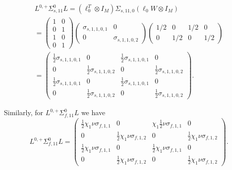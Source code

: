 \begin{multline}
	L^{0,+}  \Sigma_{s,11}^{0} L = (\ell_{0}^{T} \otimes I_{M})\Sigma_{s,11,0} (\ell_{0} W \otimes I_{M}) \\ = 
	\begin{pmatrix}
		1 & 0 \\
		0 & 1 \\
		1 & 0 \\
		0 & 1
	\end{pmatrix}
	\begin{pmatrix}
		\sigma_{s,1,1,0,1} & 0 \\
		0 & \sigma_{s,1,1,0,2}
	\end{pmatrix}
	\begin{pmatrix}
		1/2 & 0 & 1/2 & 0 \\
		0 & 1/2 & 0 & 1/2
	\end{pmatrix} \\ =
	\begin{pmatrix}
		\frac{1}{2} \sigma_{s,1,1,0,1} & 0 & \frac{1}{2} \sigma_{s,1,1,0,1} & 0 \\
		0 & \frac{1}{2} \sigma_{s,1,1,0,2} & 0 & \frac{1}{2} \sigma_{s,1,1,0,2}  \\
		\frac{1}{2} \sigma_{s,1,1,0,1} & 0 & \frac{1}{2} \sigma_{s,1,1,0,1} & 0 \\
		0 & \frac{1}{2} \sigma_{s,1,1,0,2} & 0 & \frac{1}{2} \sigma_{s,1,1,0,2}
	\end{pmatrix}.
\end{multline}

%	
%	
%	

Similarly, for $L^{0,+}  \Sigma_{f,11}^{0} L$ we have
\begin{equation}
L^{0,+}  \Sigma_{f,11}^{0} L = 
		\begin{pmatrix}
			\frac{1}{2} \chi_{1}\nu\sigma_{f,1,1} & 0 & \chi_{1}\frac{1}{2} \nu\sigma_{f,1,1} & 0 \\
			0 & \frac{1}{2} \chi_{1}\nu\sigma_{f,1,2} & 0 & \frac{1}{2} \chi_{1}\nu\sigma_{f,1,2}  \\
			\frac{1}{2} \chi_{1}\nu\sigma_{f,1,1} & 0 & \frac{1}{2} \chi_{1}\nu\sigma_{f,1,1} & 0 \\
			0 & \frac{1}{2} \chi_{1}\nu\sigma_{f,1,2} & 0 & \frac{1}{2}\chi_{1} \nu\sigma_{f,1,2}
	\end{pmatrix}.
\end{equation}

